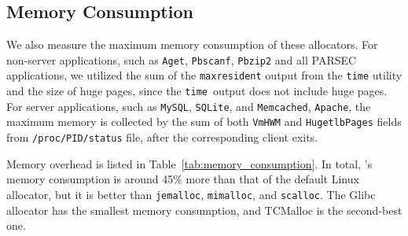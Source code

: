 \subsection{Memory Consumption}
\label{sec:memory}

We also measure the maximum memory consumption of these allocators. For non-server applications, such as \texttt{Aget}, \texttt{Pbscanf}, \texttt{Pbzip2} and all PARSEC applications, we utilized the sum of the \texttt{maxresident} output from the \texttt{time} utility and the size of huge pages, since the \texttt{time }output does not include huge pages. 
For server applications, such as \texttt{MySQL}, \texttt{SQLite}, and \texttt{Memcached}, \texttt{Apache}, the maximum memory is collected by the sum of both \texttt{VmHWM} and \texttt{HugetlbPages} fields from \texttt{/proc/PID/status} file, after the corresponding client exits. 




Memory overhead is listed in Table~\ref{tab:memory_consumption}. In total, \NM{}'s memory consumption is around 45\% more than that of the default Linux allocator, but it is better than \texttt{jemalloc}, \texttt{mimalloc}, and \texttt{scalloc}.  The Glibc allocator has the smallest memory consumption, and TCMalloc is the second-best one. 
 
